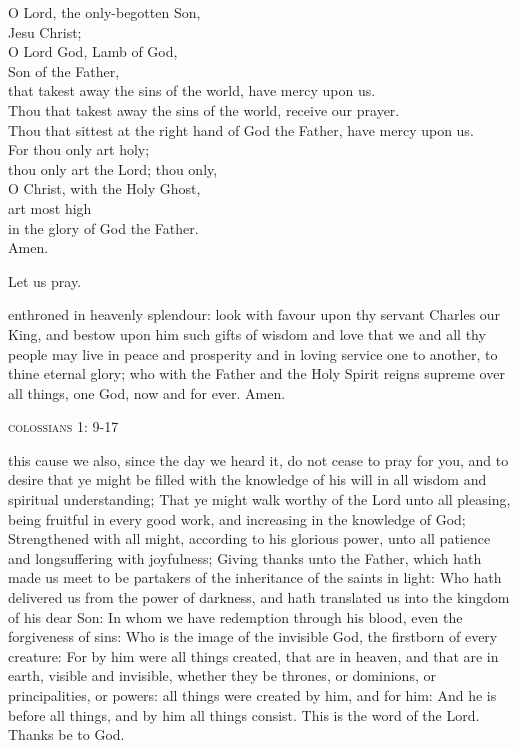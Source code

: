 {\begin{minipage}[t]{.5\textwidth}
\begin{flushright}
O Lord, the only-begotten Son,\\Jesu Christ;\\
O Lord God, Lamb of God,\\Son of the Father,\\
that takest away the sins of the world, have mercy upon us.\\
Thou that takest away the sins of the world, receive our prayer.\\
Thou that sittest at the right hand of God the Father, have mercy upon us.\\
For thou only art holy;\\thou only art the Lord; thou only,\\
O Christ, with the Holy Ghost,\\art most high\\in the glory of God the Father.\\
Amen.\\
\end{flushright}
\end{minipage}
\clearpage


Let us pray.

 enthroned in heavenly splendour:
look with favour upon thy servant Charles our King,
and bestow upon him such gifts of wisdom and love
that we and all thy people
may live in peace and prosperity
and in loving service one to another,
to thine eternal glory;
who with the Father and the Holy Spirit
reigns supreme over all things,
one God, now and for ever.
Amen.


\vfill 

\begin{center}{\color{qred}\scshape colossians 1: 9-17}\end{center}




 this cause we also, since the day we heard it, do not cease to pray for
you, and to desire that ye might be filled with the knowledge of his will in
all wisdom and spiritual understanding; That ye might walk worthy of the
Lord unto all pleasing, being fruitful in every good work, and increasing
in the knowledge of God; Strengthened with all might, according to his
glorious power, unto all patience and longsuffering with joyfulness; Giving
thanks unto the Father, which hath made us meet to be partakers of the
inheritance of the saints in light: Who hath delivered us from the power
of darkness, and hath translated us into the kingdom of his dear Son: In
whom we have redemption through his blood, even the forgiveness of
sins: Who is the image of the invisible God, the firstborn of every creature:
For by him were all things created, that are in heaven, and that are in
earth, visible and invisible, whether they be thrones, or dominions, or
principalities, or powers: all things were created by him, and for him: And
he is before all things, and by him all things consist.
This is the word of the Lord.
Thanks be to God.


}
